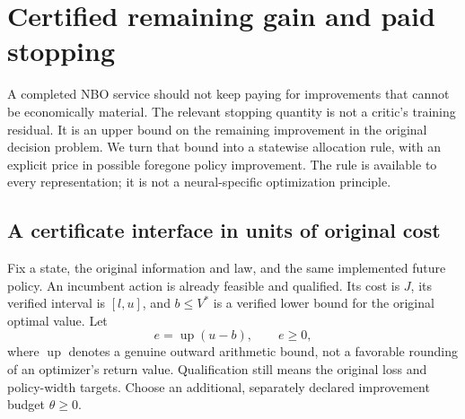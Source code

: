 \section{Certified remaining gain and paid stopping}\label{sec:budget110}
A completed NBO service should not keep paying for improvements that cannot be economically material. The relevant stopping quantity is not a critic's training residual. It is an upper bound on the remaining improvement in the original decision problem. We turn that bound into a statewise allocation rule, with an explicit price in possible foregone policy improvement. The rule is available to every representation; it is not a neural-specific optimization principle.

\subsection{A certificate interface in units of original cost}
Fix a state, the original information and law, and the same implemented future policy. An incumbent action is already feasible and qualified. Its cost is $J$, its verified interval is $[l,u]$, and $b\le V^*$ is a verified lower bound for the original optimal value. Let
\[
 e=\operatorname{up}(u-b),\qquad e\ge0,
\]
where $\operatorname{up}$ denotes a genuine outward arithmetic bound, not a favorable rounding of an optimizer's return value. Qualification still means the original loss and policy-width targets. Choose an additional, separately declared improvement budget $\theta\ge0$.

